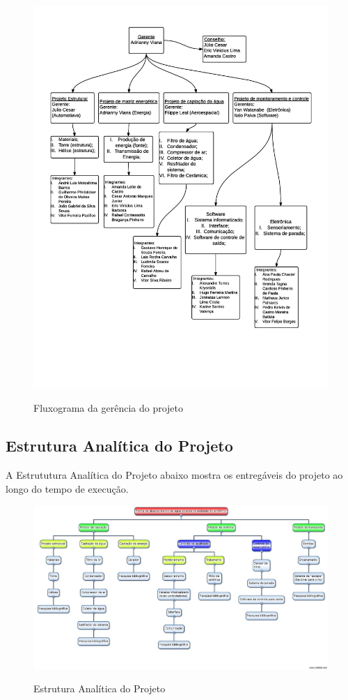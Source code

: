     \begin{figure}[!h]
      \centering
      \includegraphics[scale = 0.27]{editaveis/figuras/Fluxograma_gerencia}
      \label{fluxograma_gerencia_projeto}
      \caption{Fluxograma da gerência do projeto}
    \end{figure}
    \FloatBarrier
    
  \pagebreak
  \subsection{Estrutura Analítica do Projeto}
    
    A Estrututura Analítica do Projeto abaixo mostra os entregáveis do projeto ao longo do tempo de execução.
    
   \begin{figure}[!h]
    \centering
    \includegraphics[scale = 0.4, angle=90]{editaveis/figuras/EAP}
    \label{EAP}
    \caption{Estrutura Analítica do Projeto}
   \end{figure}
   \FloatBarrier
   

